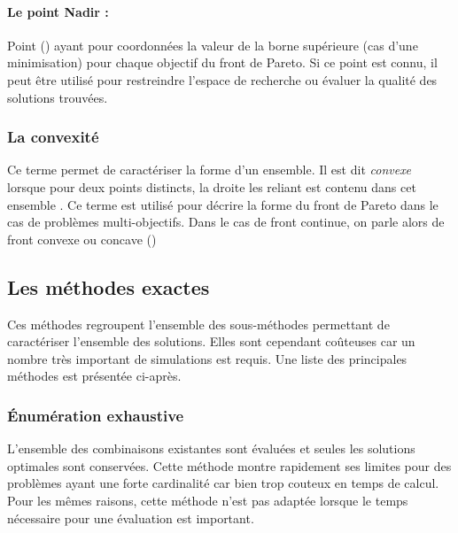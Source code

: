 \paragraph{Le point Nadir :} %
\label{par:le_point_nadir}
Point () ayant pour coordonnées la
valeur de la borne supérieure (cas d’une minimisation) pour chaque objectif du front
de Pareto. Si ce point est connu, il peut être utilisé pour restreindre l’espace
de recherche ou évaluer la qualité des solutions trouvées.



\subsubsection{La convexité} %
\label{ssub:la_convexite}
Ce terme permet de caractériser la forme d’un ensemble.
Il est dit \emph{convexe} lorsque pour deux points distincts, la droite les reliant
est contenu dans cet ensemble \parencite{Collette2002}. Ce terme est utilisé pour décrire
la forme du front de Pareto dans le cas de problèmes multi-objectifs. Dans le cas
de front continue, on parle alors de front convexe ou concave ()



\subsection{Les méthodes exactes} %
\label{sub:les_methodes_exactes}
Ces méthodes regroupent l’ensemble des sous-méthodes permettant de caractériser
l’ensemble des solutions. Elles sont cependant coûteuses car un nombre très important
de simulations est requis. Une liste des principales méthodes est présentée ci-après.


\subsubsection{Énumération exhaustive} %
\label{ssub:enumeration_exhaustive}
L’ensemble des combinaisons existantes sont évaluées et seules les solutions optimales
sont conservées. Cette méthode montre rapidement ses limites pour des problèmes ayant une
forte cardinalité car bien trop couteux en temps de calcul. Pour les mêmes raisons,
cette méthode n’est pas adaptée lorsque le temps nécessaire pour une évaluation est
important.


